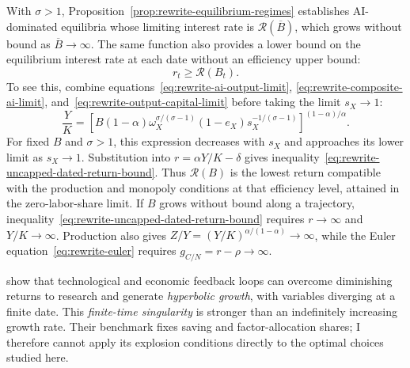 With $\sigma>1$, Proposition~\ref{prop:rewrite-equilibrium-regimes}
establishes AI-dominated equilibria whose limiting interest rate is
$\mathcal R(\overline B)$, which grows without bound as
$\overline B\to\infty$. %
The same function also provides a lower bound on the equilibrium interest
rate at each date without an efficiency upper bound:
\begin{equation}
 r_t\geq\mathcal R(B_t)%
 .
 \label{eq:rewrite-uncapped-dated-return-bound}
\end{equation}
To see this, combine equations~\eqref{eq:rewrite-ai-output-limit},
\eqref{eq:rewrite-composite-ai-limit}, and~\eqref{eq:rewrite-output-capital-limit}
before taking the limit $s_X\to1$:
\begin{equation}
 \frac YK=
 \left[B(1-\alpha)\omega_X^{\sigma/(\sigma-1)}
 (1-e_X)s_X^{-1/(\sigma-1)}\right]^{(1-\alpha)/\alpha}.
 \label{eq:rewrite-substitutes-dated-output-capital}
\end{equation}
For fixed $B$ and $\sigma>1$, this expression decreases with $s_X$ and
approaches its lower limit as $s_X\to1$.
Substitution into $r=\alpha Y/K-\delta$ gives
inequality~\eqref{eq:rewrite-uncapped-dated-return-bound}.
Thus $\mathcal R(B)$ is the lowest return compatible with the production
and monopoly conditions at that efficiency level, attained in the
zero-labor-share limit. If $B$ grows without bound along a trajectory, inequality~\eqref{eq:rewrite-uncapped-dated-return-bound} requires
$r\to\infty$ and $Y/K\to\infty$. Production also gives
$Z/Y=(Y/K)^{\alpha/(1-\alpha)}\to\infty$, while the Euler
equation~\eqref{eq:rewrite-euler} requires
$g_{C/N}=r-\rho\to\infty$.

\citet{davidsonetal2026} show that technological and economic feedback loops
can overcome diminishing returns to research and generate \emph{hyperbolic
growth}, with variables diverging at a finite date. This \emph{finite-time
singularity} is stronger than an indefinitely increasing growth rate.
Their benchmark fixes saving and factor-allocation shares; I therefore
cannot apply its explosion conditions directly to the optimal choices
studied here.

